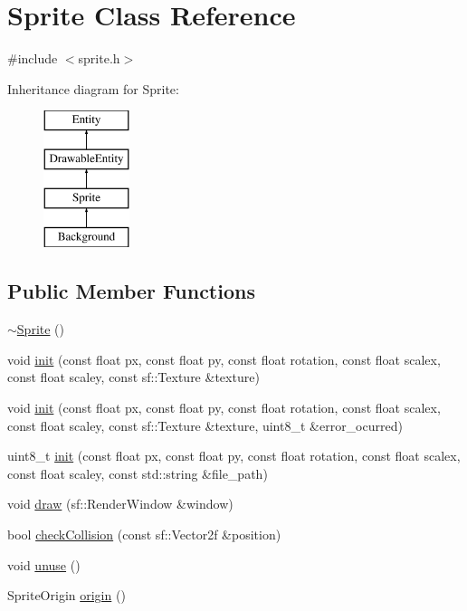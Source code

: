 \hypertarget{class_sprite}{}\section{Sprite Class Reference}
\label{class_sprite}


{\ttfamily \#include $<$sprite.\+h$>$}

Inheritance diagram for Sprite\+:\begin{figure}[H]
\begin{center}
\leavevmode
\includegraphics[height=4.000000cm]{class_sprite}
\end{center}
\end{figure}
\subsection*{Public Member Functions}
\begin{DoxyCompactItemize}
\item 
\hyperlink{class_sprite_a8accab430f9d90ae5117b57d67e32b84}{$\sim$\+Sprite} ()
\item 
void \hyperlink{class_sprite_a51cf0234a0f71f4c9fb722a9e331305a}{init} (const float px, const float py, const float rotation, const float scalex, const float scaley, const sf\+::\+Texture \&texture)
\item 
void \hyperlink{class_sprite_af9c2ffd6e4c3f1cc1791562be86fe2cc}{init} (const float px, const float py, const float rotation, const float scalex, const float scaley, const sf\+::\+Texture \&texture, uint8\+\_\+t \&error\+\_\+ocurred)
\item 
uint8\+\_\+t \hyperlink{class_sprite_ae60101c72db08a33215ec89faae8a87c}{init} (const float px, const float py, const float rotation, const float scalex, const float scaley, const std\+::string \&file\+\_\+path)
\item 
void \hyperlink{class_sprite_adf1e840c7fe51abacc8a8f80c9e63c81}{draw} (sf\+::\+Render\+Window \&window)
\item 
bool \hyperlink{class_sprite_acb1a84678f2536ff83b5f2c44dfa3b45}{check\+Collision} (const sf\+::\+Vector2f \&position)
\item 
void \hyperlink{class_sprite_a26019c4dc52face7a098ddace9926863}{unuse} ()
\item 
Sprite\+Origin \hyperlink{class_sprite_a0eccfb75237b7c5eda33810cb1080daf}{origin} ()
\end{DoxyCompactItemize}
